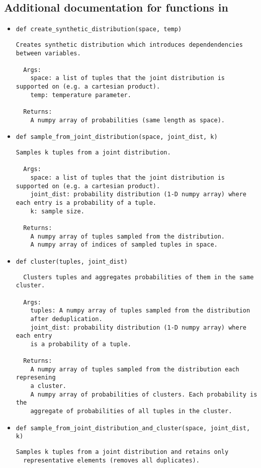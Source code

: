 \subsection{Additional documentation for functions in }
\label{sec:listing-doc}
%
{\footnotesize
  \begin{itemize}
  \item \verb!def create_synthetic_distribution(space, temp)!
    \begin{verbatim}
Creates synthetic distribution which introduces dependendencies between variables.

  Args:
    space: a list of tuples that the joint distribution is supported on (e.g. a cartesian product).
    temp: temperature parameter.

  Returns:
    A numpy array of probabilities (same length as space).  
\end{verbatim}
  \item \verb!def sample_from_joint_distribution(space, joint_dist, k)!
\begin{verbatim}
Samples k tuples from a joint distribution.

  Args:
    space: a list of tuples that the joint distribution is supported on (e.g. a cartesian product).
    joint_dist: probability distribution (1-D numpy array) where each entry is a probability of a tuple.
    k: sample size.

  Returns:
    A numpy array of tuples sampled from the distribution.
    A numpy array of indices of sampled tuples in space.
\end{verbatim}
  \item \verb!def cluster(tuples, joint_dist)!
\begin{verbatim}
  Clusters tuples and aggregates probabilities of them in the same cluster.

  Args:
    tuples: A numpy array of tuples sampled from the distribution
    after deduplication.
    joint_dist: probability distribution (1-D numpy array) where each entry
    is a probability of a tuple.

  Returns:
    A numpy array of tuples sampled from the distribution each represening
    a cluster.
    A numpy array of probabilities of clusters. Each probability is the
    aggregate of probabilities of all tuples in the cluster.
\end{verbatim}
  \item \verb!def sample_from_joint_distribution_and_cluster(space, joint_dist, k)!
\begin{verbatim}
Samples k tuples from a joint distribution and retains only
  representative elements (removes all duplicates).


\end{verbatim}
\end{itemize}}

